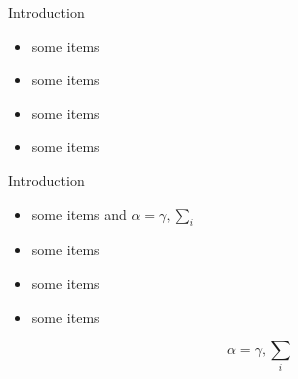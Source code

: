\documentclass[final,hyperref={pdfpagelabels=false}]{beamer}
\begin{document}
\begin{frame}{}
\begin{columns}[t]
\begin{column}{.25\linewidth}
        \begin{block}{Introduction}
          \begin{itemize}
          \item some items
          \item some items
          \item some items
          \item some items
          \end{itemize}
        \end{block}

        \begin{block}{Introduction}
          \begin{itemize}
          \item some items and $\alpha=\gamma, \sum_{i}$
          \item some items
          \item some items
          \item some items
          \end{itemize}
          $$\alpha=\gamma, \sum_{i}$$
        \end{block}
      \end{column}
    \end{columns}
  \end{frame}
\end{document}
